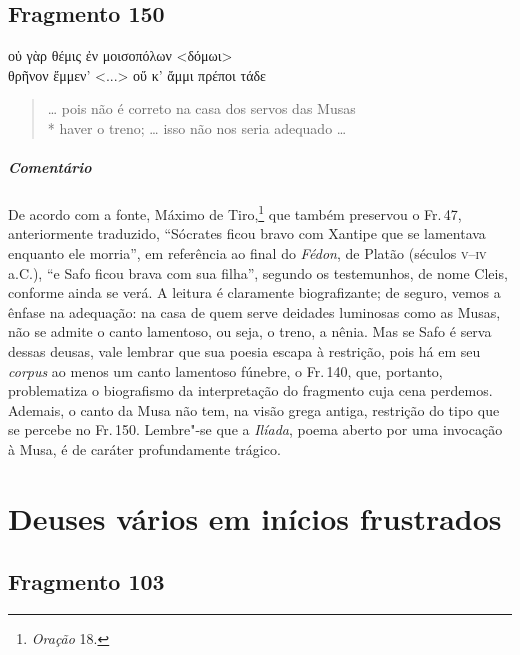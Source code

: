 \pagebreak
\section{Fragmento 150}

\begin{gkverse}
οὐ γὰρ θέμις ἐν μοισοπόλων <δόμωι>\\
θρῆνον ἔμμεν’ <...> οὔ κ’ ἄμμι πρέποι τάδε
\end{gkverse}

\begin{verse}
\ldots{} pois não é correto na casa dos servos das Musas\\*
haver o treno; \ldots{} isso não nos seria adequado \ldots{}
\end{verse}

\medskip

{\paragraph{Comentário} De acordo com a fonte, Máximo de Tiro,\footnote{\textit{Oração} 18.} que também preservou o Fr.\,47, anteriormente traduzido, ``Sócrates ficou bravo com Xantipe que se
lamentava enquanto ele morria'', em referência ao final do \textit{Fédon}, de
Platão (séculos \textsc{v--iv} a.C.), ``e Safo ficou brava com sua filha'', segundo os testemunhos, de
nome Cleis, conforme ainda se verá. A leitura é
claramente biografizante; de seguro, vemos a ênfase na adequação: na casa de quem serve
deidades luminosas como as Musas, não se admite o canto lamentoso, ou seja, o
treno, a nênia. Mas se Safo é serva dessas deusas, vale lembrar que sua poesia
escapa à restrição, pois há em seu \textit{corpus} ao menos um canto lamentoso
fúnebre, o Fr.\,140, que, portanto, problematiza o biografismo da interpretação
do fragmento cuja cena perdemos. Ademais, o canto da Musa não tem, na visão grega antiga, restrição 
do tipo que se percebe no Fr.\,150. Lembre"-se que a \textit{Ilíada},
poema aberto por uma invocação à Musa, é de caráter
profundamente trágico.}


\chapter{Deuses vários em inícios frustrados}


\section{Fragmento 103}

